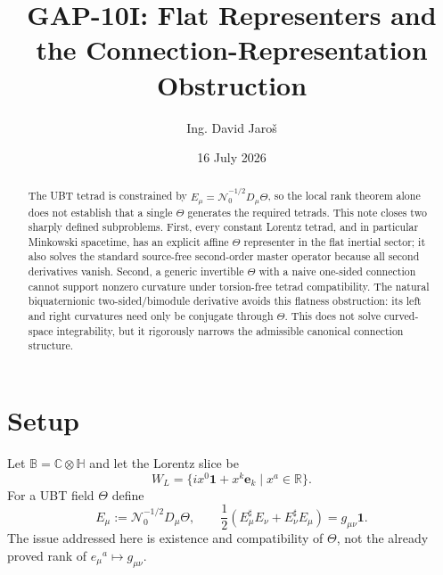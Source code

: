 \documentclass[12pt,a4paper]{article}
\title{GAP-10I: Flat Representers and the Connection-Representation Obstruction}
\author{Ing. David Jaro\v{s}}
\date{16 July 2026}
\theoremstyle{remark}\newtheorem{remark}[definition]{Remark}
\newcommand{\B}{\mathbb B}
\begin{document}
\maketitle
\UBTProvenanceNotice

\begin{abstract}
The UBT tetrad is constrained by
$E_\mu=\mathcal N_0^{-1/2}D_\mu\Theta$, so the local rank theorem alone does
not establish that a single $\Theta$ generates the required tetrads.  This
note closes two sharply defined subproblems.  First, every constant Lorentz
tetrad, and in particular Minkowski spacetime, has an explicit affine
$\Theta$ representer in the flat inertial sector; it also solves the standard
source-free second-order master operator because all second derivatives
vanish.  Second, a generic invertible $\Theta$ with a naive one-sided
connection cannot support nonzero curvature under torsion-free tetrad
compatibility.  The natural biquaternionic two-sided/bimodule derivative avoids
this flatness obstruction: its left and right curvatures need only be conjugate
through $\Theta$.  This does not solve curved-space integrability, but it
rigorously narrows the admissible canonical connection structure.
\end{abstract}

\section{Setup}
Let $\B=\mathbb C\otimes\mathbb H$ and let the Lorentz slice be
\begin{equation}
 W_L=\{i x^0\mathbf1+x^k\mathbf e_k\mid x^a\in\mathbb R\}.
\end{equation}
For a UBT field $\Theta$ define
\begin{equation}
 E_\mu:=\mathcal N_0^{-1/2}D_\mu\Theta,
 \qquad
 \frac12(E_\mu^\sharp E_\nu+E_\nu^\sharp E_\mu)
 =g_{\mu\nu}\mathbf1.
 \label{eq:tetrad-metric}
\end{equation}
The issue addressed here is existence and compatibility of $\Theta$, not the
already proved rank of $e_\mu{}^a\mapsto g_{\mu\nu}$.
\end{document}
